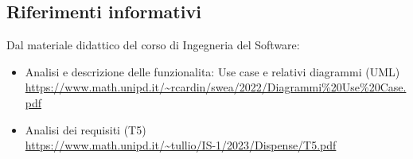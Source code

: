 \subsection{Riferimenti informativi}\label{sec:riferimenti_informativi}
Dal materiale didattico del corso di Ingegneria del Software:
\begin{itemize}
    \item Analisi e descrizione delle funzionalita: Use case e relativi diagrammi (UML) \\
    \url{https://www.math.unipd.it/~rcardin/swea/2022/Diagrammi%20Use%20Case.pdf}
    \item Analisi dei requisiti (T5) \\
    \url{https://www.math.unipd.it/~tullio/IS-1/2023/Dispense/T5.pdf}
\end{itemize}